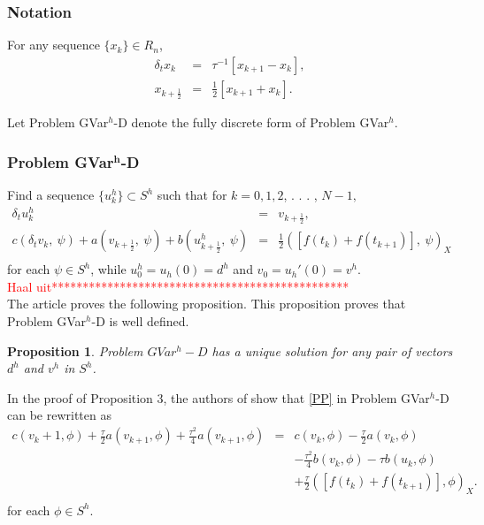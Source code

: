 \documentclass[../../main.tex]{subfiles}
\begin{document}
\subsubsection{Notation}
For any sequence $\{x_k\} \in R_n$,
\begin{eqnarray*}
	\delta_{t}x_{k}& = &\tau^{-1}[x_{k+1}-x_{k}],\\
	x_{k+\frac{1}{2}} & = & \frac{1}{2}[x_{k+1}+x_{k}].
\end{eqnarray*}

Let Problem GVar$^h$-D denote the fully discrete form of Problem GVar$^h$.
\subsubsection*{Problem GVar$^\mathbf{{h}}$-D}
Find a sequence $\{u_{k}^{h}\}\subset S^{h}$ such that for $k=0,1,2$, . . . , $N-1,$
\begin{eqnarray}
	\delta_{t}u_{k}^{h}\ & = & v_{k+\frac{1}{2}},\\
	c(\delta_{t}v_{k},\ \psi)+a(v_{k+\frac{1}{2}},\ \psi)+b(u_{k+\frac{1}{2}}^{h},\ \psi) & = & \frac{1}{2}([f(t_{k})+f(t_{k+1})],\ \psi)_{X} \nonumber \\ \label{PP}
\end{eqnarray}
for each $\psi\in S^{h}$, while $u_{0}^{h}=u_{h}(0)=d^{h}$ and $v_{0}=u_{h}'(0)=v^{h}$.\\


\textcolor{red}{Haal uit************************************************}\\
The article \cite{BV13} proves the following proposition. This proposition proves that Problem GVar$^h$-D is well defined.

\newtheorem{DC_Prop4}[DC_Prop2]{Proposition}
\begin{DC_Prop4}
	Problem $GVar^{h}-D$ has a unique solution for any pair of vectors $d^{h}$ and $v^{h}$ in $S^{h}$.
\end{DC_Prop4}

In the proof of Proposition 3, the authors of \cite{BV13} show that \eqref{PP} in Problem GVar$^h$-D can be rewritten as
\begin{eqnarray}
	c(v_k+1,\phi) + \frac{\tau}{2} a(v_{k+1},\phi) + \frac{\tau^2}{4} a(v_{k+1},\phi) & = & c(v_k,\phi) - \frac{\tau}{2} a(v_k,\phi) \nonumber \\  &&
	 - \frac{\tau^2}{4}b(v_k,\phi) - \tau b(u_k,\phi) \nonumber\\
	 &&+\frac{\tau}{2}([f(t_k)+f(t_{k+1})],\phi)_X.\nonumber \\ \label{PPP}
\end{eqnarray} for each $\phi \in S^h$.\\
\end{document}
